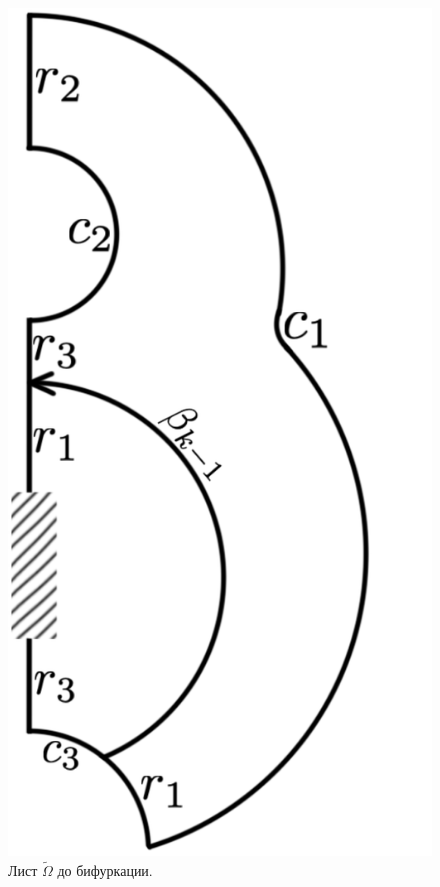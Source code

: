 \begin{figure}[!htb]
\includegraphics[scale=0.12]{images/section3_circular/atoms/III/page_segment_2.pdf}
    \caption{Лист $\widetilde{\Omega}$ до бифуркации.}
        \label{fig:pt10:_III_page_segment_2}
\endminipage\hfill
\end{figure}

